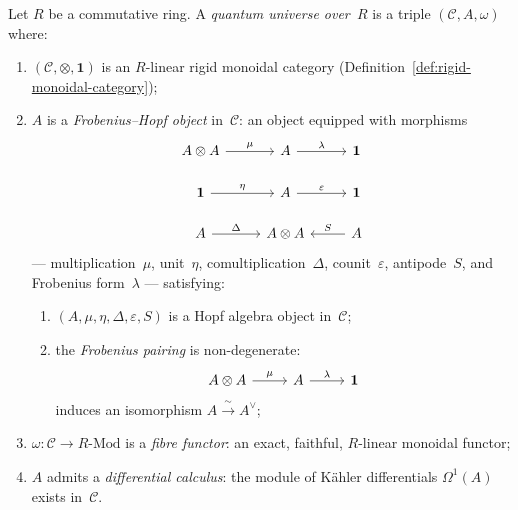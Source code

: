 \begin{definition}
\label{def:quantum-universe}
\leanok
Let $R$ be a commutative ring.  A \emph{quantum universe over~$R$} is a
triple $(\mathcal{C}, A, \omega)$ where:
\begin{enumerate}
  \item $(\mathcal{C}, \otimes, \mathbf{1})$ is an $R$-linear rigid
        monoidal category
        (Definition~\ref{def:rigid-monoidal-category});
  \item $A$ is a \emph{Frobenius--Hopf object} in~$\mathcal{C}$: an
        object equipped with morphisms
        \[
        \begin{tikzcd}[row sep=1.5em, column sep=2.5em]
          A \otimes A \ar[r, "\mu"] & A \ar[r, "\lambda"] & \mathbf{1}
          \\
          \mathbf{1} \ar[r, "\eta"] & A \ar[r, "\varepsilon"] & \mathbf{1}
          \\
          A \ar[r, "\Delta"] & A \otimes A
          & A \ar[l, "S"']
        \end{tikzcd}
        \]
        --- multiplication~$\mu$, unit~$\eta$, comultiplication~$\Delta$,
        counit~$\varepsilon$, antipode~$S$, and Frobenius
        form~$\lambda$ --- satisfying:
        \begin{enumerate}
          \item[\textup{(H)}] $(A, \mu, \eta, \Delta, \varepsilon, S)$ is
                a Hopf algebra object in~$\mathcal{C}$;
          \item[\textup{(F)}] the \emph{Frobenius pairing} is
                non-degenerate:
                \begin{equation}\label{eq:frobenius-pairing}
                \begin{tikzcd}[column sep=2.5em]
                  A \otimes A \ar[r, "\mu"]
                  & A \ar[r, "\lambda"]
                  & \mathbf{1}
                \end{tikzcd}
                \end{equation}
                induces an isomorphism $A \xrightarrow{\;\sim\;} A^{\vee}$;
        \end{enumerate}
  \item $\omega \colon \mathcal{C} \to R\text{-}\mathrm{Mod}$ is a
        \emph{fibre functor}: an exact, faithful, $R$-linear monoidal
        functor;
  \item $A$ admits a \emph{differential calculus}: the module of
        K\"ahler differentials $\Omega^1(A)$ exists in~$\mathcal{C}$.
\end{enumerate}
\end{definition}

